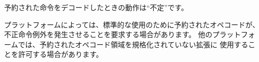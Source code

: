 予約された命令をデコードしたときの動作は``不定''です。

\begin{commentary}
プラットフォームによっては、標準的な使用のために予約されたオペコードが、
不正命令例外を発生させることを要求する場合があります。
他のプラットフォームでは、予約されたオペコード領域を規格化されていない拡張に
使用することを許可する場合があります。
\end{commentary}

\begin{comment}
\begin{figure}[h]
\begin{center}
\setlength{\tabcolsep}{4pt}
\begin{tabular}{p{1.2in}@{}p{0.8in}@{}p{0.8in}@{}p{0.6in}@{}p{0.8in}@{}p{1in}l}
\\
\instbitrange{31}{25} &
\instbitrange{24}{20} &
\instbitrange{19}{15} &
\instbitrange{14}{12} &
\instbitrange{11}{7} &
\instbitrange{6}{0} \\
\cline{1-6}
\multicolumn{1}{|c|}{funct7} &
\multicolumn{1}{c|}{rs2} &
\multicolumn{1}{c|}{rs1} &
\multicolumn{1}{c|}{funct3} &
\multicolumn{1}{c|}{rd} &
\multicolumn{1}{c|}{opcode} &
R-type \\
\cline{1-6}
\\
\cline{1-6}
\multicolumn{2}{|c|}{imm[11:0]} &
\multicolumn{1}{c|}{rs1} &
\multicolumn{1}{c|}{funct3} &
\multicolumn{1}{c|}{rd} &
\multicolumn{1}{c|}{opcode} &
I-type \\
\cline{1-6}
\\
\cline{1-6}
\multicolumn{1}{|c|}{imm[11:5]} &
\multicolumn{1}{c|}{rs2} &
\multicolumn{1}{c|}{rs1} &
\multicolumn{1}{c|}{funct3} &
\multicolumn{1}{c|}{imm[4:0]} &
\multicolumn{1}{c|}{opcode} &
S-type \\
\cline{1-6}
\\
\cline{1-6}
\multicolumn{4}{|c|}{imm[31:12]} &
\multicolumn{1}{c|}{rd} &
\multicolumn{1}{c|}{opcode} &
U-type \\
\cline{1-6}
\end{tabular}
\end{center}
\caption{RISC-V base instruction formats.  Each immediate subfield is
  labeled with the bit position (imm[{\em x}\,]) in the immediate
  value being produced, rather than the bit position within the
  instruction's immediate field as is usually done.  }
\label{fig:baseinstformats}
\end{figure}
\end{comment}

